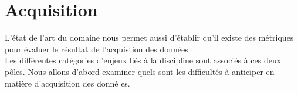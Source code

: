\section{Acquisition}
L'état de l'art du domaine nous permet aussi d'établir qu'il existe des métriques pour évaluer le résultat de l'acquistion des données \cite{giotWeb}.\\
Les différentes catégories d'enjeux liés à la discipline sont associés à ces deux pôles. Nous allons d'abord examiner quels sont les difficultés à anticiper en matière d'acquisition des donné es.



